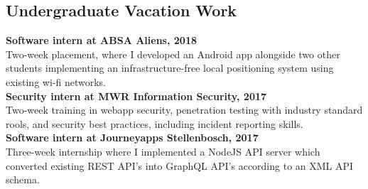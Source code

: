 \documentclass[10pt,a4paper,notitlepage]{article}
\begin{document}
\subsection*{Undergraduate Vacation Work}
\begin{spacing}{1.1}
\textbf{Software intern at ABSA Aliens, 2018}\\
Two-week placement, where I developed an Android app alongside two other students implementing an
infrastructure-free local positioning system using existing wi-fi networks. 
    \vspace*{0.5em}\\
\textbf{Security intern at MWR Information Security, 2017}\\
Two-week training in webapp security, penetration testing with industry standard rools, and security
best practices, including incident reporting skills.
    \vspace*{0.5em}\\
\textbf{Software intern at Journeyapps Stellenbosch, 2017}\\
Three-week internship where I implemented a NodeJS API server which converted existing REST API's
into GraphQL API's according to an XML API schema.
\end{spacing}
\end{document}
